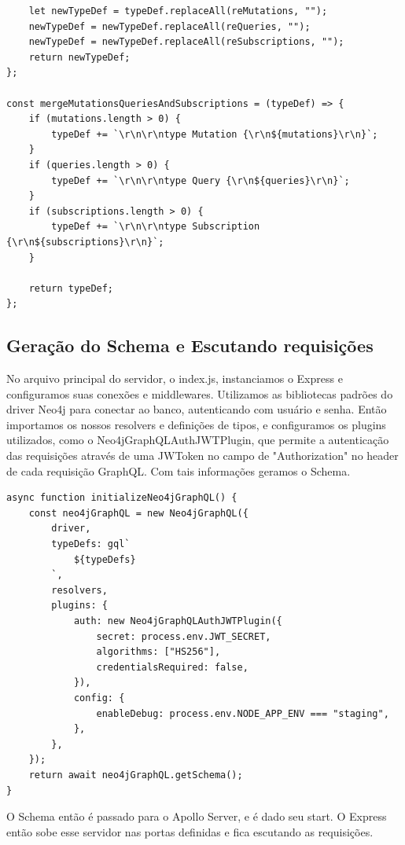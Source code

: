 \begin{lstlisting}
	let newTypeDef = typeDef.replaceAll(reMutations, "");
	newTypeDef = newTypeDef.replaceAll(reQueries, "");
	newTypeDef = newTypeDef.replaceAll(reSubscriptions, "");
	return newTypeDef;
};

const mergeMutationsQueriesAndSubscriptions = (typeDef) => {
	if (mutations.length > 0) {
		typeDef += `\r\n\r\ntype Mutation {\r\n${mutations}\r\n}`;
	}
	if (queries.length > 0) {
		typeDef += `\r\n\r\ntype Query {\r\n${queries}\r\n}`;
	}
	if (subscriptions.length > 0) {
		typeDef += `\r\n\r\ntype Subscription {\r\n${subscriptions}\r\n}`;
	}

	return typeDef;
};
\end{lstlisting}


\subsection{Geração do Schema e Escutando requisições}

No arquivo principal do servidor, o index.js, instanciamos o Express e configuramos suas conexões e middlewares. Utilizamos as bibliotecas padrões do driver Neo4j para conectar ao banco, autenticando com usuário e senha. Então importamos os nossos resolvers e definições de tipos, e configuramos os plugins utilizados, como o Neo4jGraphQLAuthJWTPlugin, que permite a autenticação das requisições através de uma JWToken no campo de "Authorization" no header de cada requisição GraphQL. Com tais informações geramos o Schema.

\begin{lstlisting}
async function initializeNeo4jGraphQL() {
	const neo4jGraphQL = new Neo4jGraphQL({
		driver,
		typeDefs: gql`
			${typeDefs}
		`,
		resolvers,
		plugins: {
			auth: new Neo4jGraphQLAuthJWTPlugin({
				secret: process.env.JWT_SECRET,
				algorithms: ["HS256"],
				credentialsRequired: false,
			}),
			config: {
				enableDebug: process.env.NODE_APP_ENV === "staging",
			},
		},
	});
	return await neo4jGraphQL.getSchema();
}
\end{lstlisting}

O Schema então é passado para o Apollo Server, e é dado seu start. O Express então sobe esse servidor nas portas definidas e fica escutando as requisições.